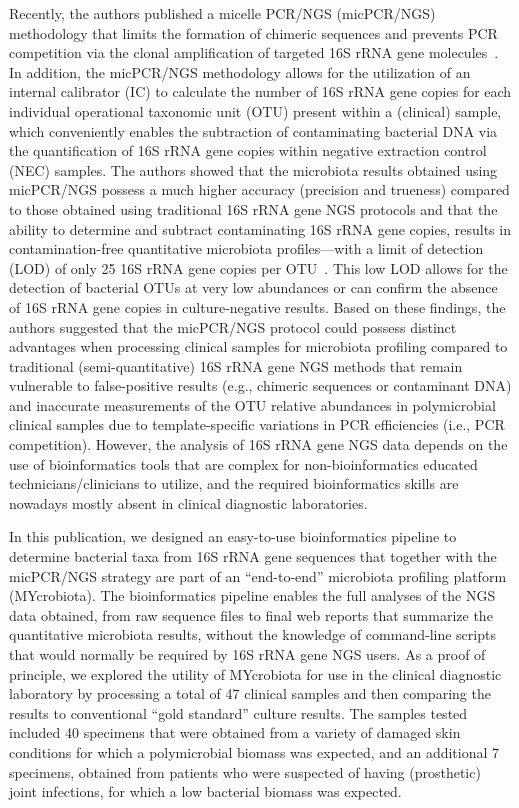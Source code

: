 Recently, the authors published a micelle PCR/NGS (micPCR/NGS) methodology that limits the formation of chimeric sequences
and prevents PCR competition via the clonal amplification of targeted 16S rRNA gene molecules~\cite{boers2015micelle}. In addition, the micPCR/NGS
methodology allows for the utilization of an internal calibrator (IC) to calculate the number of 16S rRNA gene copies for each
individual operational taxonomic unit (OTU) present within a (clinical) sample, which conveniently enables the subtraction of
contaminating bacterial DNA via the quantification of 16S rRNA gene copies within negative extraction control (NEC) samples.
The authors showed that the microbiota results obtained using micPCR/NGS possess a much higher accuracy (precision and trueness)
compared to those obtained using traditional 16S rRNA gene NGS protocols and that the ability to determine and subtract contaminating
16S rRNA gene copies, results in contamination-free quantitative microbiota profiles—with a limit of detection (LOD) of only 25 16S
rRNA gene copies per OTU~\cite{boers2017novel}. This low LOD allows for the detection of bacterial OTUs at very low abundances or can confirm the absence
of 16S rRNA gene copies in culture-negative results. Based on these findings, the authors suggested that the micPCR/NGS protocol could
possess distinct advantages when processing clinical samples for microbiota profiling compared to traditional (semi-quantitative) 16S
rRNA gene NGS methods that remain vulnerable to false-positive results (e.g., chimeric sequences or contaminant DNA) and inaccurate
measurements of the OTU relative abundances in polymicrobial clinical samples due to template-specific variations in PCR efficiencies
(i.e., PCR competition). However, the analysis of 16S rRNA gene NGS data depends on the use of bioinformatics tools that are complex
for non-bioinformatics educated technicians/clinicians to utilize, and the required bioinformatics skills are nowadays mostly absent
in clinical diagnostic laboratories.

In this publication, we designed an easy-to-use bioinformatics pipeline to determine bacterial taxa from 16S rRNA gene sequences that
together with the micPCR/NGS strategy are part of an “end-to-end” microbiota profiling platform (MYcrobiota). The bioinformatics pipeline
enables the full analyses of the NGS data obtained, from raw sequence files to final web reports that summarize the quantitative
microbiota results, without the knowledge of command-line scripts that would normally be required by 16S rRNA gene NGS users. As a
proof of principle, we explored the utility of MYcrobiota for use in the clinical diagnostic laboratory by processing a total of 47
clinical samples and then comparing the results to conventional “gold standard” culture results. The samples tested included 40
specimens that were obtained from a variety of damaged skin conditions for which a polymicrobial biomass was expected, and an
additional 7 specimens, obtained from patients who were suspected of having (prosthetic) joint infections, for which a low bacterial
biomass was expected.

